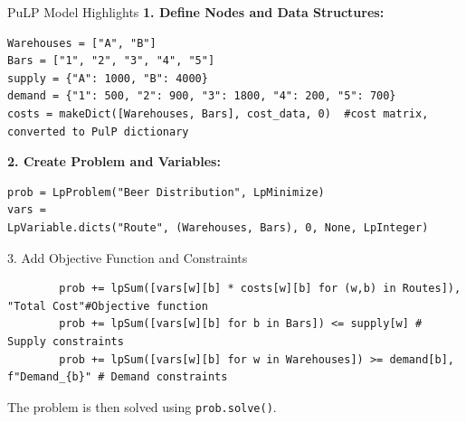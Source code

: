 \documentclass{purdue-slide}
\begin{document}

\begin{frame}[fragile]{PuLP Model Highlights}
	\textbf{1. Define Nodes and Data Structures:}
\begin{verbatim}
Warehouses = ["A", "B"]
Bars = ["1", "2", "3", "4", "5"]
supply = {"A": 1000, "B": 4000}
demand = {"1": 500, "2": 900, "3": 1800, "4": 200, "5": 700}
costs = makeDict([Warehouses, Bars], cost_data, 0)	#cost matrix, converted to PulP dictionary
\end{verbatim}

	\textbf{2. Create Problem and Variables:}
	\begin{verbatim}
prob = LpProblem("Beer Distribution", LpMinimize)
vars =
LpVariable.dicts("Route", (Warehouses, Bars), 0, None, LpInteger)
	\end{verbatim}
\end{frame}

\begin{frame}[fragile]{3. Add Objective Function and Constraints}
	\begin{verbatim}
		prob += lpSum([vars[w][b] * costs[w][b] for (w,b) in Routes]), "Total Cost"#Objective function
		prob += lpSum([vars[w][b] for b in Bars]) <= supply[w] # Supply constraints
		prob += lpSum([vars[w][b] for w in Warehouses]) >= demand[b], f"Demand_{b}" # Demand constraints
	\end{verbatim}
	The problem is then solved using \verb|prob.solve()|.
\end{frame}

\end{document}
